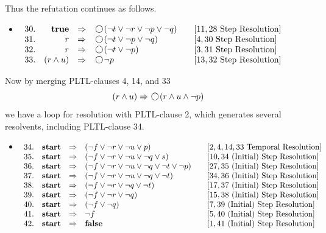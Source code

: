 \documentclass[nohyperref]{acmtrans2f}
\newcommand{\next}{\!\raisebox{-.2ex}{ %
                        \mbox{\unitlength=0.9ex
                        \begin{picture}(2,2)
                        \linethickness{0.06ex}
                        \put(1,1){\circle{2}} %
                        \end{picture}}}       %
                        \,}
\def\unless{\hbox{$\,\cal W \,$}}
\let\imp=\Rightarrow
\def\ltrue{\hbox{\rm\bf true}}
\def\lfalse{\hbox{\rm\bf false}}
\def\lstart{\hbox{\rm\bf start}}
\begin{document}
Thus the refutation continues as follows.
%
\begin{itemize}
\item[] $\begin{array}[t]{rrcll}
30. & \ltrue & \imp & \next( \neg t \lor \neg r \lor \neg p \lor \neg q)\quad &
[11,28 \mbox{ Step Resolution}] \\
31. & r & \imp & \next( \neg t  \lor \neg p \lor \neg q) &
[4,30 \mbox{ Step Resolution}] \\
32. & r & \imp & \next( \neg t  \lor \neg p) & [3,31 \mbox{ Step Resolution}] \\
33. & (r \land u) & \imp & \next \neg p & [13,32 \mbox{ Step Resolution}] \\
\end{array}$
\end{itemize}
%
Now by merging PLTL-clauses 4, 14, and 33
$$
(r \land u) \imp \next (r \land u \land \neg p)
$$
we have a loop for resolution with PLTL-clause 2, which generates 
several resolvents, including PLTL-clause 34.
\begin{itemize}
\item[] $\begin{array}[t]{rrcll}
34. & \lstart & \imp & (\neg f \lor \neg r \lor \neg u \lor p) & [2,4,14,33 \mbox{ Temporal Resolution}]  \\
35. & \lstart & \imp & (\neg f \lor \neg r \lor \neg u \lor \neg q \lor s) & [10,34 \mbox{ (Initial) Step Resolution}]  \\
36. & \lstart & \imp & (\neg f \lor \neg r \lor \neg u \lor \neg q \lor
\neg t \lor \neg p)\quad & [27,35 \mbox{ (Initial) Step Resolution}]  \\
37. & \lstart & \imp & (\neg f \lor \neg r \lor \neg u \lor \neg q \lor
\neg t) & [34,36 \mbox{ (Initial) Step Resolution}]  \\
38. & \lstart & \imp & (\neg f \lor \neg r \lor \neg q \lor \neg t) & [17,37 \mbox{ (Initial) Step Resolution}]  \\
39. & \lstart & \imp & (\neg f \lor \neg r \lor \neg q) & [15,38 \mbox{
(Initial) Step Resolution}]  \\
40. & \lstart & \imp & (\neg f \lor \neg q) & [7,39 \mbox{ (Initial) Step Resolution}]  \\
41. & \lstart & \imp & \neg f  & [5,40 \mbox{ (Initial) Step Resolution}]  \\
42. & \lstart & \imp & \lfalse  & [1,41 \mbox{ (Initial) Step Resolution}]  \\
\end{array}$
\end{itemize}
\end{document}
